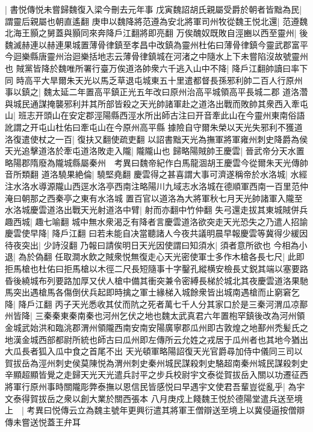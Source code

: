 |{
	書悦傳悦未嘗歸魏復入梁今刪去元年事}
戊寅魏詔胡氏親屬受爵於朝者皆黜為民|{
	謂靈后親屬也朝直遙翻}
庚申以魏降將范遵為安北將軍司州牧從魏王悦北還|{
	范遵魏北海王顥之舅蓋與顥同來奔降戶江翻將即亮翻}
万俟醜奴既敗自涇豳以西至靈州|{
	後魏滅赫連以赫連果城置薄骨律鎮至孝昌中改鎮為靈州杜佑曰薄骨律鎮今靈武郡富平今迴樂縣唐靈州治迴樂括地志云薄骨律鎮城在河渚之中隨水上下未嘗陷沒故號靈州也}
賊黨皆降於魏唯所署行臺万俟道洛帥衆六千逃入山中不降|{
	降戶江翻帥讀曰率下同}
時高平大旱爾朱天光以馬乏草退屯城東五十里遣都督長孫邪利帥二百人行原州事以鎮之|{
	魏太延二年置高平鎮正光五年改曰原州治高平城領高平長城二郡}
道洛濳與城民通謀掩襲邪利并其所部皆殺之天光帥諸軍赴之道洛出戰而敗帥其衆西入牽屯山|{
	班志开頭山在安定郡涇陽縣西涇水所出師古注曰开音牽此山在今靈州東南俗語訛謂之开屯山杜佑曰牽屯山在今原州高平縣}
據險自守爾朱榮以天光失邪利不獲道洛復遣使杖之一百|{
	復扶又翻使疏吏翻}
以詔書黜天光為撫軍將軍雍州刺史降爵為侯天光追擊道洛於牽屯道洛敗走入隴|{
	隴隴山也}
歸略陽賊帥王慶雲|{
	晉武帝分天水置略陽郡隋廢為隴城縣屬秦州　考異曰魏帝紀作白馬龍涸胡王慶雲今從爾朱天光傳帥音所類翻}
道洛驍果絶倫|{
	驍堅堯翻}
慶雲得之甚喜謂大事可濟遂稱帝於水洛城|{
	水經注水洛水導源隴山西逕水洛亭西南注略陽川九域志水洛城在德順軍西南一百里范仲淹曰朝那之西秦亭之東有水洛城}
置百官以道洛為大將軍秋七月天光帥諸軍入隴至水洛城慶雲道洛出戰天光射道洛中臂|{
	射而亦翻中竹仲翻}
失弓還走拔其東城賊併兵趣西城|{
	趣七喻翻}
城中無水衆渴乏有降者言慶雲道洛欲突走天光恐失之乃遣人招諭慶雲使早降|{
	降戶江翻}
曰若未能自决當聽諸人今夜共議明晨早報慶雲等冀得少緩因待夜突出|{
	少詩沒翻}
乃報曰請俟明日天光因使謂曰知須水|{
	須者意所欲也}
今相為小退|{
	為於偽翻}
任取澗水飲之賊衆悦無復走心天光密使軍士多作木槍各長七尺|{
	此即拒馬槍也杜佑曰拒馬槍以木徑二尺長短隨事十字鑿孔縱横安檢長丈鋭其端以塞要路}
昏後繞城布列要路加厚又伏人槍中備其衝突兼令密縛長梯於城北其夜慶雲道洛果馳馬突出遇槍馬各傷倒伏兵起即時擒之軍士緣梯入城餘衆皆出城南遇槍而止窮窘乞降|{
	降戶江翻}
丙子天光悉收其仗而阬之死者萬七千人分其家口於是三秦河渭瓜凉鄯州皆降|{
	三秦秦東秦南秦也河州乞伏之地也魏太武真君六年置枹罕鎮後改為河州領金城武始洪和臨洮郡渭州領隴西南安南安陽廣寧郡瓜州即古敦煌之地鄯州禿髪氏之地漢金城西部都尉所統也師古曰瓜州即左傳所云允姓之戎居于瓜州者也其地今猶出大瓜長者狐入瓜中食之首尾不出}
天光頓軍略陽詔復天光官爵尋加侍中儀同三司以賀拔岳為涇州刺史侯莫陳悦為渭州刺史秦州城民謀殺刺史駱超南秦州城民謀殺刺史辛顯超顯皆覺之走歸天光天光遣兵討平之步兵校尉宇文泰從賀拔岳入關以功遷征西將軍行原州事時關隴彫弊泰撫以恩信民皆感悦曰早遇宇文使君吾輩豈從亂乎|{
	為宇文泰得賀拔岳之衆以創大業於關西張本}
八月庚戍上餞魏王悦於德陽堂遣兵送至境上　|{
	考異曰悦傳云立為魏主號年更興衍遣其將軍王僧辯送至境上以冀侵逼按僧辯傳未嘗送悦蓋王弁耳}
